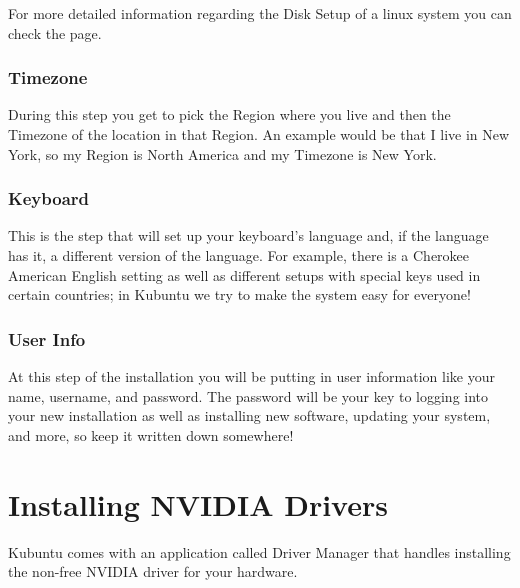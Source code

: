 \documentclass[letterpaper,10pt,english]{sphinxmanual}
\begin{document}
For more detailed information regarding the Disk Setup of a linux system you can check the  page.


\subsection{Timezone}
\label{\detokenize{docs/installation:timezone}}
During this step you get to pick the Region where you live and then the Timezone of the location in that Region. An example would be that I live in New York, so my Region is North America and my Timezone is New York.



\subsection{Keyboard}
\label{\detokenize{docs/installation:keyboard}}
This is the step that will set up your keyboard’s language and, if the language has it, a different version of the language. For example, there is a Cherokee American English setting as well as different setups with special keys used in certain countries; in Kubuntu we try to make the system easy for everyone!



\subsection{User Info}
\label{\detokenize{docs/installation:user-info}}
At this step of the installation you will be putting in user information like your name, username, and password. The password will be your key to logging into your new installation as well as installing new software, updating your system, and more, so keep it written down somewhere!



\chapter{Installing NVIDIA Drivers}
\label{\detokenize{docs/driver-manager:installing-nvidia-drivers}}\label{\detokenize{docs/driver-manager:driver-manager-link}}\label{\detokenize{docs/driver-manager::doc}}
Kubuntu comes with an application called Driver Manager that handles installing the non-free NVIDIA driver for your hardware.
\end{document}
